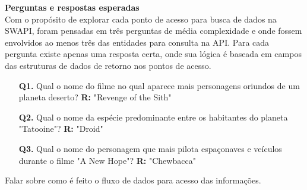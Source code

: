 \textbf{Perguntas e respostas esperadas} \\

Com o propósito de explorar cada ponto de acesso para busca de dados na SWAPI, foram pensadas em três perguntas de média complexidade e onde fossem envolvidos ao menos três das entidades para consulta na API. Para cada pergunta existe apenas uma resposta certa, onde sua lógica é baseada em campos das estruturas de dados de retorno nos pontos de acesso.

\begin{enumerate}
\item[\textbf{Q1.}] Qual o nome do filme no qual aparece mais personagens oriundos de um planeta deserto? \textbf{R:} "Revenge of the Sith"
\item[\textbf{Q2.}] Qual o nome da espécie predominante entre os habitantes do planeta "Tatooine"? \textbf{R:} "Droid"
\item[\textbf{Q3.}] Qual o nome do personagem que mais pilota espaçonaves e veículos durante o filme "A New Hope"? \textbf{R:} "Chewbacca"
\end{enumerate}

Falar sobre como é feito o fluxo de dados para acesso das informações.

